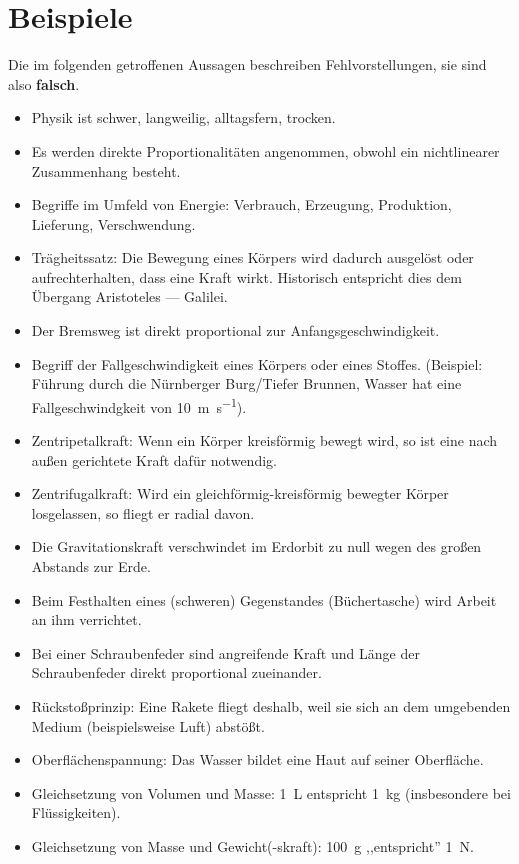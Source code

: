 \bip\bip
\section{Beispiele}
Die im folgenden getroffenen Aussagen beschreiben
Fehlvorstellungen, sie sind also {\bf falsch}.

\begin{itemize}
\item Physik ist schwer, langweilig, alltagsfern, trocken.
\item
Es werden direkte Proportionalit\"{a}ten angenommen, obwohl ein
nichtlinearer Zusammenhang besteht.
\item
Begriffe im Umfeld von Energie: Verbrauch, Erzeugung,
Produktion, Lieferung, Verschwendung.
\end{itemize}

\begin{itemize}
\item Tr\"{a}gheitssatz:
Die Bewegung eines K\"{o}rpers wird dadurch ausgel\"{o}st oder
aufrechterhalten, dass eine Kraft wirkt.
Historisch entspricht dies dem \"{U}bergang Aristoteles --- Galilei.
\item Der Bremsweg ist direkt proportional zur Anfangsgeschwindigkeit.
\item Begriff der Fallgeschwindigkeit eines K\"{o}rpers oder eines
Stoffes.
(Beispiel: F\"{u}hrung durch die N\"{u}rnberger Burg/Tiefer
Brunnen, Wasser hat eine Fallgeschwindgkeit von \SI{10}{\meter\per\second}).
\item Zentripetalkraft: Wenn ein K\"{o}rper kreisf\"{o}rmig bewegt wird,
so ist eine nach au{\ss}en gerichtete Kraft daf\"{u}r notwendig.
\item Zentrifugalkraft: Wird ein gleichf\"{o}rmig-kreisf\"{o}rmig bewegter K\"{o}rper losgelassen, so fliegt er radial davon.
\item Die Gravitationskraft verschwindet im Erdorbit zu null wegen des großen Abstands zur Erde.
\item
Beim Festhalten eines (schweren) Gegenstandes (B\"{u}chertasche) wird Arbeit an ihm verrichtet.
\item
Bei einer Schraubenfeder sind angreifende Kraft und L\"{a}nge der Schraubenfeder
direkt proportional zueinander.
\item R\"{u}cksto{\ss}prinzip: Eine Rakete fliegt deshalb, weil sie sich an dem umgebenden Medium (beispielsweise Luft) abst\"{o}{\ss}t.
\item
Oberfl\"{a}chenspannung: Das Wasser bildet eine Haut auf seiner Oberfl\"{a}che.
\item
Gleichsetzung von Volumen und Masse: \SI{1}{\liter} entspricht \SI{1}{\kilogram} (insbesondere bei Fl\"{u}ssigkeiten).
\item
Gleichsetzung von Masse und Gewicht(-skraft): \SI{100}{\gram} ,,entspricht'' \SI{1}{\newton}.
\end{itemize}

